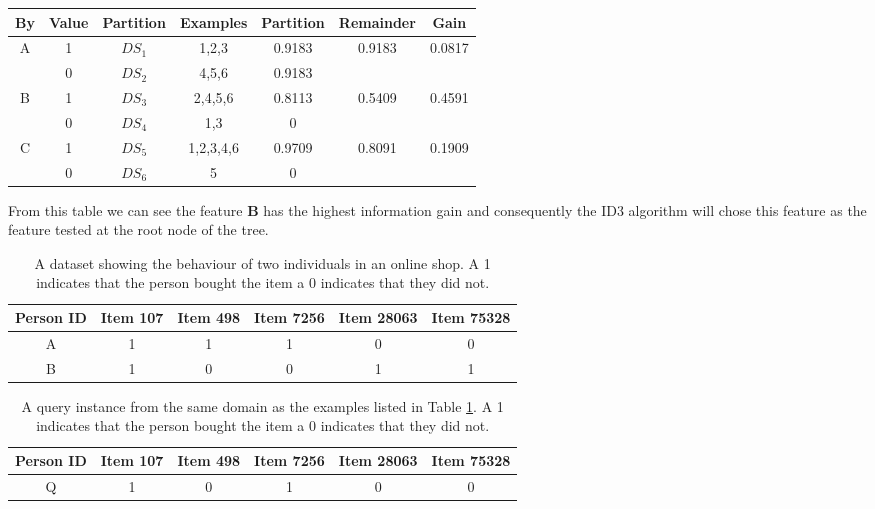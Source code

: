 \documentclass[solution]{ditpaper}
\begin{document}
\begin{enumerate}
\begin{answer}
\begin{scriptsize}
\begin{tabular}{ccccccc}
By & Value & Partition  & Examples & Partition & Remainder & Gain\\
\hline
\multirow{2}{*}{A} & 1 & $DS_1$  & 1,2,3 & 0.9183 & \multirow{2}{*}{0.9183} & \multirow{2}{*}{0.0817}\\
 & 0 & $DS_2$ & 4,5,6 & 0.9183 &  & \\
\hline
\multirow{2}{*}{B} & 1 & $DS_3$ & 2,4,5,6 & 0.8113 & \multirow{2}{*}{0.5409} & \multirow{2}{*}{0.4591}\\
& 0 & $DS_4$ & 1,3 & 0 &  & \\
\hline
\multirow{2}{*}{C} & 1 & $DS_5$ & 1,2,3,4,6 & 0.9709 & \multirow{2}{*}{0.8091} & \multirow{2}{*}{0.1909}\\
& 0 & $DS_6$ & 5 & 0 &  & \\
\hline
\end{tabular}
	\end{scriptsize}
	From this table we can see the feature \textbf{B} has the highest information gain and consequently the ID3 algorithm will chose this feature as the feature tested at the root node of the tree.
		\end{answer}

\clearpage

\begin{table}[!tb]
\caption{A dataset showing the behaviour of two individuals in an online shop. A 1 indicates that the person bought the item a 0 indicates that they did not.}
\label{table:binaryDataset}
\centering
\begin{tabular}{  c  c  c  c  c  c }
\hline
Person ID & Item 107 & Item 498 & Item 7256 & Item 28063 & Item 75328\\
\hline
A  &  1 & 1 & 1 & 0 & 0\\
B  &  1 & 0 & 0 & 1 & 1\\
\hline 
\end{tabular}
\label{tab:binarydata}
\end{table}

\begin{table}[!tb]
\caption{A query instance from the same domain as the examples listed in Table \ref{tab:binarydata}. A 1 indicates that the person bought the item a 0 indicates that they did not.}
\label{table:binaryDataset}
\centering
\begin{tabular}{  c  c  c  c  c  c }
\hline
Person ID & Item 107 & Item 498 & Item 7256 & Item 28063 & Item 75328\\
\hline
Q  &  1 & 0 & 1 & 0 & 0\\
\hline 
\end{tabular}
\label{tab:binaryquery}
\end{table}


\end{enumerate}
\end{document}
